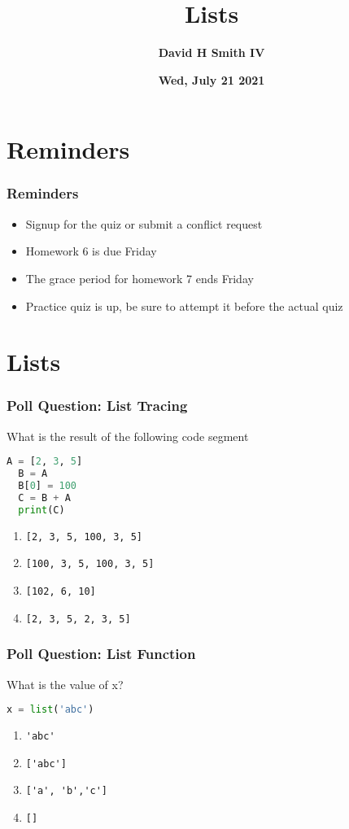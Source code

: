 \documentclass{beamer}
\title{\textbf{Lists}}
\author{\textbf{David H Smith IV}}
\institute[\textbf{UIUC}]{\textbf{University of Illinois Urbana-Champaign}}
\date{\textbf{Wed, July 21 2021}}
\begin{document}
\frame{\titlepage}

\section{Reminders}

%
%
\begin{frame}
  \frametitle{Reminders}
  \begin{itemize}
    \item Signup for the quiz or submit a conflict request
    \item Homework 6 is due Friday 
    \item The grace period for homework 7 ends Friday
    \item Practice quiz is up, be sure to attempt it before the actual quiz
  \end{itemize}
\end{frame}

\section{Lists}

%
%
\begin{frame}[fragile]
  \frametitle{Poll Question: List Tracing}
  What is the result of the following code segment
  \begin{lstlisting}[language=Python, autogobble]
  A = [2, 3, 5]
  B = A
  B[0] = 100
  C = B + A
  print(C)
  \end{lstlisting}
  \vfill
  \begin{enumerate}[A]
    \item \lstinline|[2, 3, 5, 100, 3, 5]|
    \item \lstinline|[100, 3, 5, 100, 3, 5]|
    \item \lstinline|[102, 6, 10]|
    \item \lstinline|[2, 3, 5, 2, 3, 5]|
  \end{enumerate}
\end{frame}

%
%
\begin{frame}[fragile]
  \frametitle{Poll Question: List Function}
  What is the value of x?
  \begin{lstlisting}[language=Python, autogobble]
  x = list('abc')
  \end{lstlisting}
  \vfill
  \begin{enumerate}[A]
    \item \lstinline|'abc'|
    \item \lstinline|['abc']|
    \item \lstinline|['a', 'b','c']|
    \item \lstinline|[]|
  \end{enumerate}
\end{frame}
\end{document}
